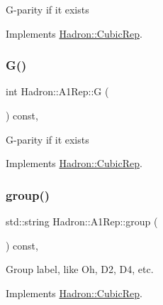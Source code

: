 G-\/parity if it exists 

Implements \mbox{\hyperlink{structHadron_1_1CubicRep_a52104e43266d1614c00bbd1c3b395458}{Hadron\+::\+Cubic\+Rep}}.

\mbox{\label{structHadron_1_1A1Rep_a0d1f85837b8f29f9e51656b8bf2abfed}} 
\subsubsection{\texorpdfstring{G()}{G()}\hspace{0.1cm}{\footnotesize\ttfamily [2/2]}}
{\footnotesize\ttfamily int Hadron\+::\+A1\+Rep\+::G (\begin{DoxyParamCaption}{ }\end{DoxyParamCaption}) const\hspace{0.3cm}{\ttfamily [inline]}, {\ttfamily [virtual]}}

G-\/parity if it exists 

Implements \mbox{\hyperlink{structHadron_1_1CubicRep_a52104e43266d1614c00bbd1c3b395458}{Hadron\+::\+Cubic\+Rep}}.

\mbox{\label{structHadron_1_1A1Rep_a12c63341924c5a2e4c0444911503c3f8}} 
\subsubsection{\texorpdfstring{group()}{group()}\hspace{0.1cm}{\footnotesize\ttfamily [1/2]}}
{\footnotesize\ttfamily std\+::string Hadron\+::\+A1\+Rep\+::group (\begin{DoxyParamCaption}{ }\end{DoxyParamCaption}) const\hspace{0.3cm}{\ttfamily [inline]}, {\ttfamily [virtual]}}

Group label, like Oh, D2, D4, etc. 

Implements \mbox{\hyperlink{structHadron_1_1CubicRep_a0748f11ec87f387062c8e8981339a29c}{Hadron\+::\+Cubic\+Rep}}.

\mbox{\label{structHadron_1_1A1Rep_a12c63341924c5a2e4c0444911503c3f8}} 
